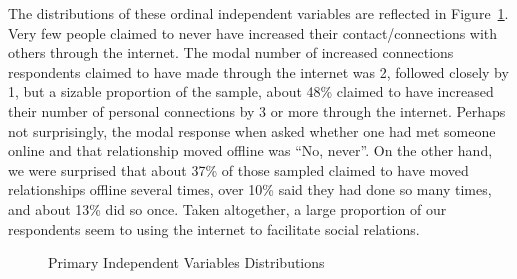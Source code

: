 \documentclass[]{interact}
\theoremstyle{plain}%
\theoremstyle{definition}
\theoremstyle{remark}
\begin{document}
The distributions of these ordinal independent variables are reflected
in Figure~\ref{fig-var-dist}. Very few people claimed to never have
increased their contact/connections with others through the internet.
The modal number of increased connections respondents claimed to have
made through the internet was 2, followed closely by 1, but a sizable
proportion of the sample, about 48\% claimed to have increased their
number of personal connections by 3 or more through the internet.
Perhaps not surprisingly, the modal response when asked whether one had
met someone online and that relationship moved offline was ``No,
never''. On the other hand, we were surprised that about 37\% of those
sampled claimed to have moved relationships offline several times, over
10\% said they had done so many times, and about 13\% did so once. Taken
altogether, a large proportion of our respondents seem to using the
internet to facilitate social relations.

\begin{figure}


\caption{\label{fig-var-dist}Primary Independent Variables
Distributions}

\end{figure}%
\end{document}
